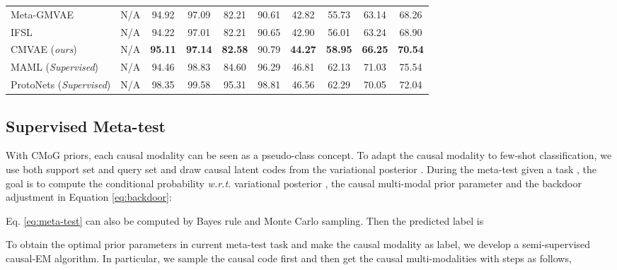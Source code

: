 \documentclass[letterpaper]{article} \usepackage{aaai23}  \usepackage{times}  \usepackage{helvet}  \usepackage{courier}  \usepackage[hyphens]{url}  \usepackage{graphicx} \urlstyle{rm} \def\UrlFont{\rm}  \usepackage{natbib}  \usepackage{caption} \frenchspacing  \setlength{\pdfpagewidth}{8.5in}  \setlength{\pdfpageheight}{11in}  \usepackage{algorithm}
\theoremstyle{plain}
\theoremstyle{definition}
\theoremstyle{remark}
\begin{document}
\begin{table*}[t]
{\begin{tabular}{llcccc|cccc}
			Meta-GMVAE                       & N/A        &     94.92      &     97.09      &     82.21      &     90.61      &     42.82      &     55.73      &     63.14      &     68.26      \\
			IFSL                   & N/A        &     94.22      &     97.01      &     82.21      &     90.65      &     42.90      &     56.01      &     63.24      &     68.90      \\ \midrule
			CMVAE (\textit{ours})            & N/A        & \textbf{95.11} & \textbf{97.14} & \textbf{82.58} &    {90.79}     & \textbf{44.27} & \textbf{58.95} & \textbf{66.25} & \textbf{70.54} \\ \midrule
			MAML (\textit{Supervised})       & N/A        &     94.46      &     98.83      &     84.60      &     96.29      &     46.81      &     62.13      &     71.03      &     75.54      \\
			ProtoNets  (\textit{Supervised}) & N/A        &     98.35      &     99.58      &     95.31      &     98.81      &     46.56      &     62.29      &     70.05      &     72.04      \\ \bottomrule
		\end{tabular}
	}
\label{tab:rest_o_m}
\end{table*}

\subsection{Supervised Meta-test}



With CMoG priors, each causal modality can be seen as a pseudo-class concept. To adapt the causal modality to few-shot classification, we use both support set and query set and draw causal latent codes from the variational posterior . During the meta-test given a task , the goal is to compute the conditional probability  \textit{w.r.t.}  variational posterior , the causal multi-modal prior parameter  and the backdoor adjustment in Equation \ref{eq:backdoor}:
  
Eq. \ref{eq:meta-test} can also be computed by Bayes rule and Monte Carlo sampling. Then the predicted label is
  




To obtain the optimal prior parameters  in current meta-test task  and make the causal modality as label, we develop a semi-supervised causal-EM algorithm. In particular, we sample the causal  code  first and then get the causal multi-modalities with steps as follows,
\end{document}

